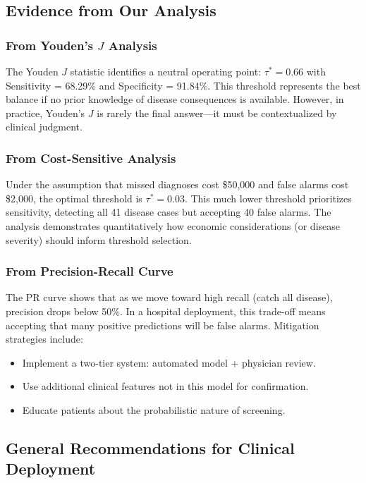 \documentclass[11pt]{article}
\begin{document}
\subsection{Evidence from Our Analysis}

\subsubsection{From Youden's $J$ Analysis}

The Youden $J$ statistic identifies a neutral operating point: $\tau^* = 0.66$ with Sensitivity = 68.29\% and Specificity = 91.84\%. This threshold represents the best balance if no prior knowledge of disease consequences is available. However, in practice, Youden's $J$ is rarely the final answer—it must be contextualized by clinical judgment.

\subsubsection{From Cost-Sensitive Analysis}

Under the assumption that missed diagnoses cost \$50,000 and false alarms cost \$2,000, the optimal threshold is $\tau^* = 0.03$. This much lower threshold prioritizes sensitivity, detecting all 41 disease cases but accepting 40 false alarms. The analysis demonstrates quantitatively how economic considerations (or disease severity) should inform threshold selection.

\subsubsection{From Precision-Recall Curve}

The PR curve shows that as we move toward high recall (catch all disease), precision drops below 50\%. In a hospital deployment, this trade-off means accepting that many positive predictions will be false alarms. Mitigation strategies include:
\begin{itemize}
    \item Implement a two-tier system: automated model + physician review.
    \item Use additional clinical features not in this model for confirmation.
    \item Educate patients about the probabilistic nature of screening.
\end{itemize}

\subsection{General Recommendations for Clinical Deployment}
\end{document}
